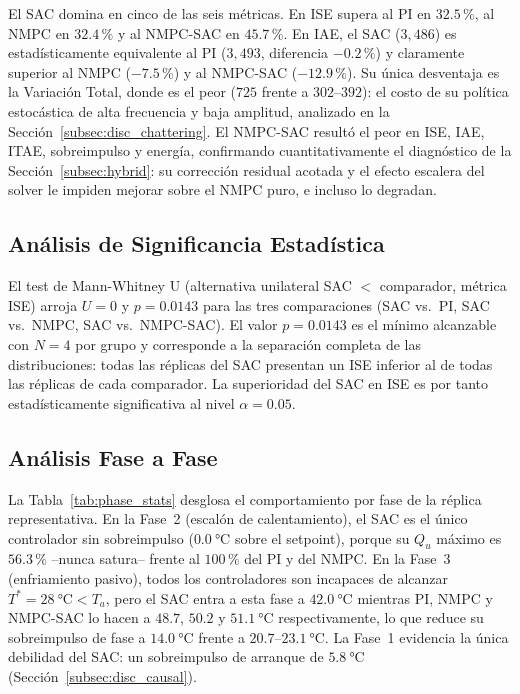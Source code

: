 \documentclass[processes,article,submit,moreauthors,pdftex]{Definitions/mdpi}
\newcommand{\Qu}{Q_u}
\newcommand{\Tref}{T^*}
\begin{document}
El SAC domina en cinco de las seis métricas. En ISE supera al PI en
$32.5\,\%$, al NMPC en $32.4\,\%$ y al NMPC-SAC en $45.7\,\%$. En IAE, el
SAC ($3{,}486$) es estadísticamente equivalente al PI ($3{,}493$, diferencia
$-0.2\,\%$) y claramente superior al NMPC ($-7.5\,\%$) y al NMPC-SAC
($-12.9\,\%$). Su única desventaja es la Variación Total, donde es el peor
($725$ frente a $302$--$392$): el costo de su política estocástica de alta
frecuencia y baja amplitud, analizado en la
Sección~\ref{subsec:disc_chattering}. El NMPC-SAC resultó el peor en ISE,
IAE, ITAE, sobreimpulso y energía, confirmando cuantitativamente el
diagnóstico de la Sección~\ref{subsec:hybrid}: su corrección residual
acotada y el efecto escalera del solver le impiden mejorar sobre el NMPC
puro, e incluso lo degradan.

\subsection{Análisis de Significancia Estadística}
\label{subsec:stats}

El test de Mann-Whitney U (alternativa unilateral SAC $<$ comparador,
métrica ISE) arroja $U = 0$ y $p = 0.0143$ para las tres comparaciones
(SAC vs.\ PI, SAC vs.\ NMPC, SAC vs.\ NMPC-SAC). El valor $p = 0.0143$ es el
mínimo alcanzable con $N=4$ por grupo y corresponde a la separación completa
de las distribuciones: todas las réplicas del SAC presentan un ISE inferior
al de todas las réplicas de cada comparador. La superioridad del SAC en ISE
es por tanto estadísticamente significativa al nivel $\alpha = 0.05$.

\subsection{Análisis Fase a Fase}
\label{subsec:phase_analysis}

La Tabla~\ref{tab:phase_stats} desglosa el comportamiento por fase de la
réplica representativa. En la Fase~2 (escalón de calentamiento), el SAC es
el único controlador sin sobreimpulso ($\SI{0.0}{\celsius}$ sobre el
setpoint), porque su $\Qu$ máximo es $56.3\,\%$ --nunca satura-- frente al
$100\,\%$ del PI y del NMPC. En la Fase~3 (enfriamiento pasivo), todos los
controladores son incapaces de alcanzar $\Tref = \SI{28}{\celsius} < T_a$,
pero el SAC entra a esta fase a $\SI{42.0}{\celsius}$ mientras PI, NMPC y
NMPC-SAC lo hacen a $48.7$, $50.2$ y $\SI{51.1}{\celsius}$ respectivamente,
lo que reduce su sobreimpulso de fase a $\SI{14.0}{\celsius}$ frente a
$20.7$--$\SI{23.1}{\celsius}$. La Fase~1 evidencia la única debilidad del
SAC: un sobreimpulso de arranque de $\SI{5.8}{\celsius}$
(Sección~\ref{subsec:disc_causal}).
\end{document}
